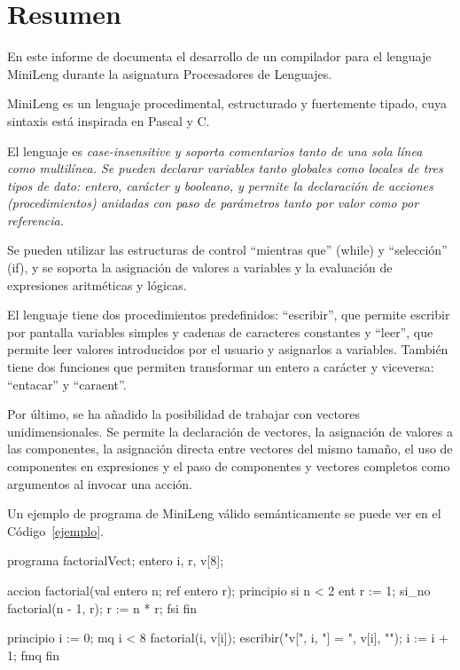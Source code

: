 
\vspace*{1cm}
\section*{\hfil Resumen \hfil}

En este informe de documenta el desarrollo de un compilador para el lenguaje MiniLeng durante la asignatura Procesadores de Lenguajes.

MiniLeng es un lenguaje procedimental, estructurado y fuertemente tipado, cuya sintaxis está inspirada en Pascal y C.

El lenguaje es \it{case-insensitive} y soporta comentarios tanto de una sola línea como multilínea. Se pueden declarar variables tanto globales como locales de tres tipos de dato: entero, carácter y booleano, y permite la declaración de acciones (procedimientos) anidadas con paso de parámetros tanto por valor como por referencia.

Se pueden utilizar las estructuras de control ``mientras que'' (while) y ``selección'' (if), y se soporta la asignación de valores a variables y la evaluación de expresiones aritméticas y lógicas.

El lenguaje tiene dos procedimientos predefinidos: ``escribir'', que permite escribir por pantalla variables simples y cadenas de caracteres constantes y ``leer'', que permite leer valores introducidos por el usuario y asignarlos a variables. También tiene dos funciones que permiten transformar un entero a carácter y viceversa: ``entacar'' y ``caraent''.

Por último, se ha añadido la posibilidad de trabajar con vectores unidimensionales. Se permite la declaración de vectores, la asignación de valores a las componentes, la asignación directa entre vectores del mismo tamaño, el uso de componentes en expresiones y el paso de componentes y vectores completos como argumentos al invocar una acción.

Un ejemplo de programa de MiniLeng válido semánticamente se puede ver en el Código~\ref{ejemplo}.

\begin{minileng}[caption={Ejemplo de programa en MiniLeng.},label={ejemplo}]
programa factorialVect;
    entero i, r, v[8];

    accion factorial(val entero n; ref entero r);
    principio
        si n < 2 ent
            r := 1;
        si_no
            factorial(n - 1, r);
            r := n * r;
        fsi
    fin

principio
    i := 0;
    mq i < 8
        factorial(i, v[i]);
        escribir("v[", i, "] = ", v[i], "\n");
        i := i + 1;
    fmq
fin\end{minileng}


